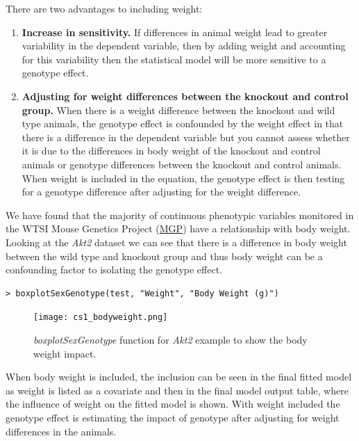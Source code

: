 \documentclass[12pt,a4paper]{article}
\begin{document}
There are two advantages to including weight:
\begin{enumerate}
 \item \textbf{Increase in sensitivity.}  
If differences in animal weight lead to greater variability in the dependent variable, then by adding weight and accounting for this variability then the statistical model will be more sensitive to a genotype effect. 

 \item \textbf{Adjusting for weight differences between the knockout and control group.}  
When there is a weight difference between the knockout and wild type animals, the genotype effect is confounded by the weight effect in that there is a difference in the dependent variable but you cannot assess whether it is due to the differences in body weight of the knockout and control animals or genotype differences between the knockout and control animals. When weight is included in the equation, the genotype effect is then testing for a genotype difference after adjusting for the weight difference.

\end{enumerate}

We have found that the majority of continuous phenotypic variables monitored in the WTSI Mouse Genetics Project (\href{http://www.sanger.ac.uk/resources/mouse/}{MGP}) have a relationship with body weight. 
Looking at the \textit{Akt2} dataset we can see that there is a difference in body weight between the wild type and knockout group and thus body weight can be a confounding factor to isolating the genotype effect.   

\begingroup
    \fontsize{8pt}{12pt}\selectfont
\begin{verbatim}
> boxplotSexGenotype(test, "Weight", "Body Weight (g)")
\end{verbatim}
\endgroup 

\begin{figure}[H]%
\centerline{\texttt{[image: cs1\_bodyweight.png]}}
\caption{\textit{boxplotSexGenotype} function for \textit{Akt2} example to show the body weight impact.}\label{fig:22}
\end{figure}

When body weight is included, the inclusion can be seen in the final fitted model as weight is listed as a covariate and then in the final model output table, where the influence of weight on the fitted model is shown.  
With weight included the genotype effect is estimating the impact of genotype after adjusting for weight differences in the animals. 
\end{document}
